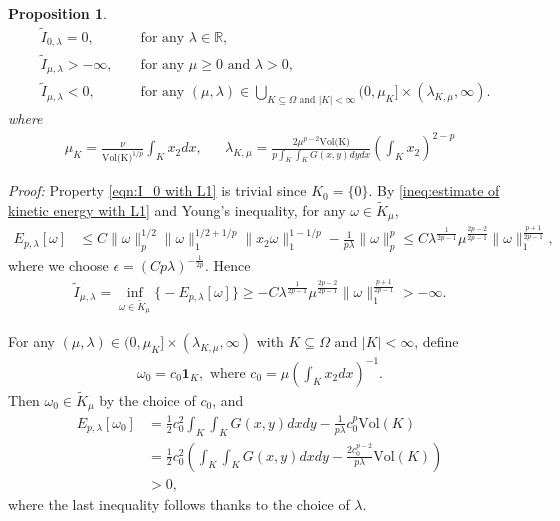\documentclass[11pt,letterpaper]{amsart}
\newtheorem{prop}[thm]{Proposition}
\theoremstyle{definition}
\theoremstyle{remark}
\newcommand{\R}{\mathbb{R}}
\newcommand{\eps}{\epsilon}
\renewcommand{\tt}[1]{\text{#1}}
\numberwithin{equation}{section}
\begin{document}
\begin{prop}\label{prop:propoties of I_mu with L1} 
    \begin{align}
        & \widetilde{I}_{0,\lambda}=0, && \text{ for any $\lambda\in \R$},   \label{eqn:I_0 with L1}
        \\
        & \widetilde{I}_{\mu,\lambda}>-\infty, && \text{ for any } \mu\geq 0 \text{ and } \lambda>0 ,\label{eqn:I_mu is finite with L1}\\
        & \widetilde{I}_{\mu,\lambda}<0, && \text{ for any } (\mu,\lambda)\in \bigcup_{K\subseteq \Omega \text{ and } |K|<\infty}
         (0, \mu_K ] \times (\lambda_{K,\mu},\infty ). \label{ineq:negativity of I_mu with L1}
    \end{align}
    where
    \begin{align*}
        \mu_K=\frac{\nu}{\tt{Vol(K)}^{1/p}} \int_K x_2 dx, && \lambda_{K,\mu}=\frac{2\mu^{p-2}\tt{Vol(K)}}{p \int_K\int_K G(x,y) dydx}\left(\int_K x_2\right)^{2-p}
    \end{align*}
\end{prop}
\noindent\textit{Proof: } Property \eqref{eqn:I_0 with L1} is trivial since $K_0=\{0\}$. By \eqref{ineq:estimate of kinetic energy with L1} and Young's inequality, for any $\omega\in \widetilde{K}_{\mu}$,
\begin{align*}
    E_{p,\lambda}[\omega]&\leq C\|\omega\|_p^{1/2}\|\omega\|_1^{1/2+1/p}\|x_2\omega\|_1^{1-1/p}-\frac{1}{p\lambda}\|\omega\|_p^p %
    \leq C \lambda^{\frac{1}{2p-1}}\mu^{\frac{2p-2}{2p-1}}\|\omega\|_{1}^{\frac{p+1}{2p-1}},
\end{align*}
where we choose $\eps=(C p\lambda)^{-\frac{1}{2p}}$. Hence
\begin{align*}
    \widetilde{I}_{\mu,\lambda}=\inf_{\omega\in \widetilde{K}_{\mu}}\big\{-E_{p,\lambda}[\omega ]\big\}\geq -C \lambda^{\frac{1}{2p-1}}\mu^{\frac{2p-2}{2p-1}}\|\omega\|_{1}^{\frac{p+1}{2p-1}}>-\infty.
\end{align*}

For any $(\mu,\lambda)\in (0,\mu_K ] \times (\lambda_{K,\mu},\infty)$ with $K \subseteq \Omega \text{ and } |K|<\infty$, define
\begin{align*}
    \omega_0=c_0 \mathbf{1}_{K}, \text{ where } c_0=\mu\left(\int_{K}x_2dx\right)^{-1}.
\end{align*}
Then $\omega_0\in \widetilde{K}_{\mu} $ by the choice of $c_0$, and 
\begin{align*}
    E_{p,\lambda}[\omega_0]&= \frac{1}{2}c_0^2\int_{K}\int_{K}G(x,y)dxdy-\frac{1}{p\lambda}c_0^p \tt{Vol}(K)\\
    &=\frac{1}{2}c_0^2\left(\int_{K}\int_{K}G(x,y)dxdy-\frac{2c_0^{p-2}}{p\lambda}\tt{Vol}(K)\right)\\
    &>0,
\end{align*}
where the last inequality follows thanks to the choice of $\lambda$.
\end{document}
